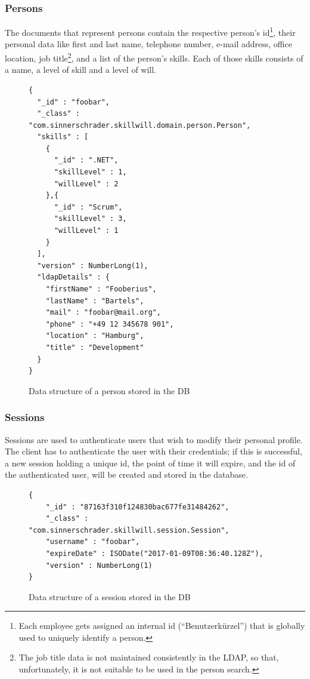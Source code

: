 \subsubsection{Persons}
The documents that represent persons contain the respective person's id\footnote{Each employee gets assigned an internal id (``Benutzerkürzel'') that is globally used to uniquely identify a person.}, their personal data like first and last name, telephone number, e-mail address, office location, job title\footnote{The job title data is not maintained consistently in the LDAP, so that, unfortunately, it is not suitable to be used in the person search.}, and a list of the person's skills. Each of those skills consists of a name, a level of skill and a level of will.

\begin{figure}
\begin{lstlisting}[language=JS]
{
  "_id" : "foobar",
  "_class" : "com.sinnerschrader.skillwill.domain.person.Person",
  "skills" : [
    {
      "_id" : ".NET",
      "skillLevel" : 1,
      "willLevel" : 2
    },{
      "_id" : "Scrum",
      "skillLevel" : 3,
      "willLevel" : 1
    }
  ],
  "version" : NumberLong(1),
  "ldapDetails" : {
    "firstName" : "Fooberius",
    "lastName" : "Bartels",
    "mail" : "foobar@mail.org",
    "phone" : "+49 12 345678 901",
    "location" : "Hamburg",
    "title" : "Development"
  }
}
\end{lstlisting}
\caption[Person (DB Data Structure)]{Data structure of a person stored in the DB}
\end{figure}

\subsubsection{Sessions}
Sessions are used to authenticate users that wish to modify their personal profile. The client has to authenticate the user with their credentials; if this is successful, a new session holding a unique id, the point of time it will expire, and the id of the authenticated user, will be created and stored in the database.

\begin{figure}
\begin{lstlisting}[language=JS]
{
	"_id" : "87163f310f124830bac677fe31484262",
	"_class" : "com.sinnerschrader.skillwill.session.Session",
	"username" : "foobar",
	"expireDate" : ISODate("2017-01-09T08:36:40.128Z"),
	"version" : NumberLong(1)
}
\end{lstlisting}
\caption[Session (DB Data Structure)]{Data structure of a session stored in the DB}
\end{figure}

